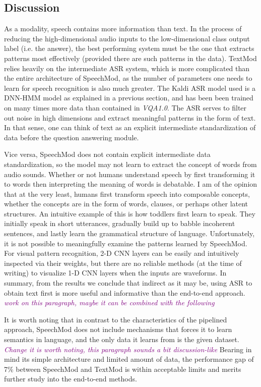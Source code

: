 \documentclass[letterpaper]{article} %
\newcommand{\tz}[1]{\textcolor{purple}{\textit{#1}}}
\begin{document}
\subsection{Discussion}
As a modality, speech contains more information than text. In the process of reducing the high-dimensional audio inputs to the low-dimensional class output label (i.e. the answer), the best performing system must be the one that extracts patterns most effectively (provided there are such patterns in the data). TextMod relies heavily on the intermediate ASR system, which is more complicated than the entire architecture of SpeechMod, as the number of parameters one needs to learn for speech recognition is also much greater. The Kaldi ASR model used is a DNN-HMM model as explained in a previous section, and has been been trained on many times more data than contained in \textit{VQA1.0}. The ASR serves to filter out noise in high dimensions and extract meaningful patterns in the form of text. In that sense, one can think of text as an explicit intermediate standardization of data before the question answering module. 

Vice versa, SpeechMod does not contain explicit intermediate data standardization, so the model may not learn to extract the concept of words from audio sounds. Whether or not humans understand speech by first transforming it to words then interpreting the meaning of words is debatable. I am of the opinion that at the very least, humans first transform speech into composable concepts, whether the concepts are in the form of words, clauses, or perhaps other latent structures. An intuitive example of this is how toddlers first learn to speak. They initially speak in short utterances, gradually build up to babble incoherent sentences, and lastly learn the grammatical structure of language. Unfortunately, it is not possible to meaningfully examine the patterns learned by SpeechMod. For visual pattern recognition, 2-D CNN layers can be easily and intuitively inspected via their weights, but there are no reliable methods (at the time of writing) to visualize 1-D CNN layers when the inputs are waveforms. In summary, from the results we conclude that indirect as it may be, using ASR to obtain text first is more useful and informative than the end-to-end approach. \tz{work on this paragraph, maybe it can be combined with the following}


It is worth noting that in contrast to the characteristics of the pipelined approach, SpeechMod does not include mechanisms that forces it to learn semantics in language, and the only data it learns from is the given dataset. \tz{Change it is worth noting, this paragraph sounds a bit discussion-like} Bearing in mind its simple architecture and limited amount of data, the performance gap of 7\% between SpeechMod and TextMod is within acceptable limits and merits further study into the end-to-end methods.
\end{document}
